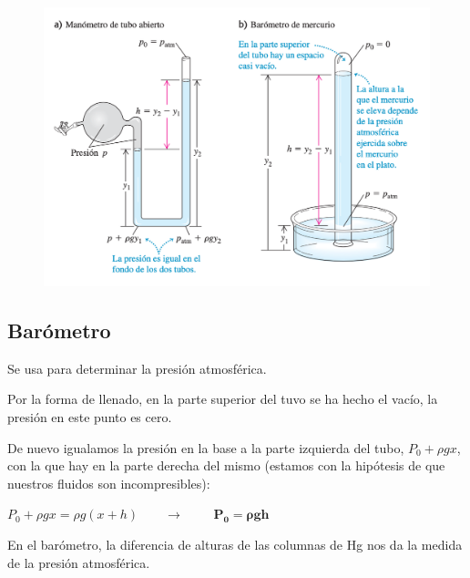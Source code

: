 \begin{figure}[H]
	\centering
	\includegraphics[width=1\textwidth]{imagenes/imagenes07/T07IM17.png}
\end{figure}



\subsection{Barómetro}

Se usa para determinar la presión atmosférica.

Por la forma de llenado, en la parte superior del tuvo se ha hecho el vacío, la presión en este punto es cero.

De nuevo igualamos la presión en la base a la parte izquierda del tubo, $P_0+\rho g x$, con la que hay en la parte derecha del mismo (estamos con la hipótesis de que nuestros fluidos son incompresibles):

$P_0+\rho g x=\rho g (x+h) \qquad \to \qquad $
$\boldsymbol{P_0=\rho g h}$

En el barómetro, la diferencia de alturas de las columnas de Hg nos da la medida de la presión atmosférica.


